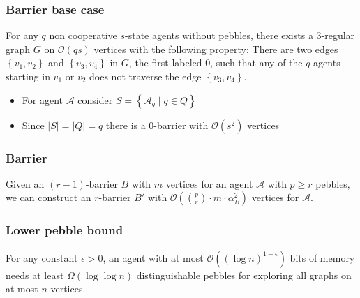 \documentclass{beamer}
\begin{document}
\begin{frame}
  \frametitle{Barrier base case}
  \begin{mdframed}
    \begin{theorem}[Fraigniaud et al.]
      For any $q$ non cooperative $s$-state agents without pebbles, there
      exists a $3$-regular graph $G$ on $\mathcal{O}(qs)$ vertices with the
      following property: There are two edges $\left\{v_{1},v_{2}\right\}$
      and $\left\{v_{3},v_{4}\right\}$ in $G$, the first labeled 0, such
      that any of the $q$ agents starting in $v_{1}$ or $v_{2}$ does not
      traverse the edge $\left\{v_{3},v_{4}\right\}$.
    \end{theorem}
  \end{mdframed}
  \begin{itemize}
    \item For agent $\mathcal{A}$ consider
      $S = \left\{\mathcal{A}_{q}\mid q\in Q\right\}$
    \item Since $|S| = |Q| = q$ there is a 0-barrier with $\mathcal{O}(s^{2})$
      vertices
  \end{itemize}
\end{frame}

\begin{frame}
  \frametitle{Barrier}
  \begin{mdframed}
    \begin{theorem}
      Given an $(r-1)$-barrier $B$ with $m$ vertices for an agent $\mathcal{A}$
      with $p\geq r$ pebbles, we can construct an $r$-barrier $B'$ with
      $\mathcal{O}(\binom{p}{r}\cdot m\cdot\alpha_{B}^{2})$ vertices for
      $\mathcal{A}$.
    \end{theorem}
  \end{mdframed}
  \begin{center}
    \resizebox{0.7\textwidth}{!}{}
  \end{center}
\end{frame}


\begin{frame}
  \frametitle{Lower pebble bound}
  \begin{mdframed}
    \begin{theorem}
      For any constant $\epsilon > 0$, an agent with at most
      $\mathcal{O}((\log n)^{1-\epsilon})$ bits of memory needs at least
      $\Omega(\log\log n)$ distinguishable pebbles for exploring all
      graphs on at most $n$ vertices.
    \end{theorem}
  \end{mdframed}
\end{frame}
\end{document}
